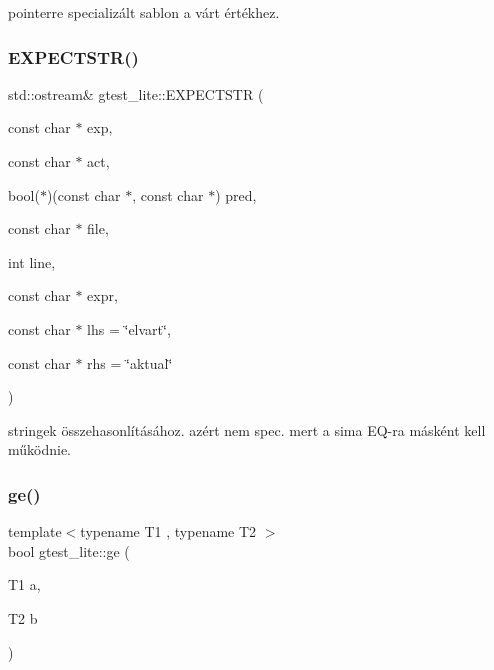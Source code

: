 pointerre specializált sablon a várt értékhez. 

\mbox{\label{namespacegtest__lite_aea477921e4c26d2a2806bc3011066270}} 
\subsubsection{\texorpdfstring{EXPECTSTR()}{EXPECTSTR()}}
{\footnotesize\ttfamily std\+::ostream\& gtest\+\_\+lite\+::\+E\+X\+P\+E\+C\+T\+S\+TR (\begin{DoxyParamCaption}\item[{const char $\ast$}]{exp,  }\item[{const char $\ast$}]{act,  }\item[{bool($\ast$)(const char $\ast$, const char $\ast$)}]{pred,  }\item[{const char $\ast$}]{file,  }\item[{int}]{line,  }\item[{const char $\ast$}]{expr,  }\item[{const char $\ast$}]{lhs = {\ttfamily \char`\"{}elvart\char`\"{}},  }\item[{const char $\ast$}]{rhs = {\ttfamily \char`\"{}aktual\char`\"{}} }\end{DoxyParamCaption})\hspace{0.3cm}{\ttfamily [inline]}}

stringek összehasonlításához. azért nem spec. mert a sima E\+Q-\/ra másként kell működnie. \mbox{\label{namespacegtest__lite_a77c1a7cf1d34c46c1d97ed39b9f06050}} 
\subsubsection{\texorpdfstring{ge()}{ge()}}
{\footnotesize\ttfamily template$<$typename T1 , typename T2 $>$ \\
bool gtest\+\_\+lite\+::ge (\begin{DoxyParamCaption}\item[{T1}]{a,  }\item[{T2}]{b }\end{DoxyParamCaption})}

\mbox{\label{namespacegtest__lite_aa0100ec9e095a9403a7b70ad4a162fdd}} 
